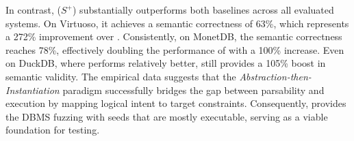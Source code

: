 \documentclass[sigconf,review,anonymous]{acmart}
\begin{document}
\begin{table}[!htbp]
\centering %
\caption{Comparison of Syntactic Correctness and Semantic Validity. $S^-$, $S$, and $S^+$ denote Raw Seeds, \sedar{}, and \tool{}, respectively.}
\label{tab:validity} %
\renewcommand\arraystretch{1}
\end{table}

In contrast, \tool{} ($S^+$) substantially outperforms both baselines across all evaluated systems. On Virtuoso, it achieves a semantic correctness of 63\%, which represents a 272\% improvement over \sedar{}. Consistently, on MonetDB, the semantic correctness reaches 78\%, effectively doubling the performance of \sedar{} with a 100\% increase. Even on DuckDB, where \sedar{} performs relatively better, \tool{} still provides a 105\% boost in semantic validity. 
The empirical data suggests that the \textit{Abstraction-then-Instantiation} paradigm successfully bridges the gap between parsability and execution by mapping logical intent to target constraints. Consequently, \tool{} provides the DBMS fuzzing with seeds that are mostly executable, serving as a viable foundation for testing.
\end{document}
